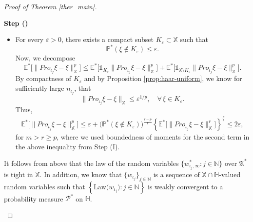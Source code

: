\documentclass[english,a4paper,11pt]{amsart}
\theoremstyle{plain}
\theoremstyle{definition}
\theoremstyle{remark}
\numberwithin{equation}{section}
\newcounter{lil1}
\newenvironment{step}
{\begin{list} { \bf Step (\Roman{lil1})}
		{ \usecounter{lil1}
			\setlength{\leftmargin}{0.0cm}
			\setlength{\topsep}{0.2cm}
			\setlength{\itemsep}{0.0cm}
			\setlength{\parsep}{0.1cm}
			\setlength{\itemindent}{0.8cm}
			\setlength{\parskip}{0.0cm}}}
	{\end{list}}
\newcounter{lil33}
\newcounter{lil1q}
\newcommand{\Law}{\mbox{Law}}
\newcommand{\NN}{\mathbb{N}}
\newcommand{\N}{\mathbb{N}}
\newcommand{\Pro}{Pro}
\begin{document}
\begin{proof}[Proof of Theorem \ref{ther_main}]
\begin{step}
\begin{itemize}
	\item 
	For every $\varepsilon > 0$, there exists a compact subset $K_\varepsilon \subset \mathbb{X}$ such that
	\[
	\mathbb{P}^{\ast} \left( \xi \notin K_\varepsilon \right) \leq \varepsilon.
	\]
	Now, we decompose
	\[
	\mathbb{E}^{\ast}\Big[\big\|\Pro_{{\iota_j}}\xi - \xi \big\|^p_{\mathbb{X}}\Big]
	\le 
	\mathbb{E}^{\ast} \Big[ \mathds{1}_{K_\varepsilon} \big\| \Pro_{{\iota_j}}\xi - \xi \big\|^p_{\mathbb{X}} \Big]
	+
	\mathbb{E}^{\ast} \Big[ \mathds{1}_{\mathbb{X}\setminus K_\varepsilon} \big\| \Pro_{{\iota_j}}\xi - \xi \big\|^p_{\mathbb{X}} \Big].
	\]
	By compactness of $K_\varepsilon$ and by Proposition \ref{prop:haar-uniform}, we know for sufficiently large $n_{\iota_j}$, that
	\[
	\big\| \Pro_{{\iota_j}} \xi  - \xi \big\|_{\mathbb{X}} \leq \varepsilon^{1/p}, \quad \forall\, \xi \in K_\varepsilon.
	\]
	Thus,
	\begin{align*}
	\mathbb{E}^{\ast}\Big[ \big\| \Pro_{{\iota_j}}\xi - \xi \big\|^p_{\mathbb{X}}\Big]
	\leq 
	\varepsilon +\big(  \mathbb{P}^{\ast} \left( \xi \notin K_\varepsilon \right)\big)^{\frac{r-p}{r}} \left\{\mathbb{E}^{\ast} \Big[\big\| \Pro_{{\iota_j}}\xi - \xi \big\|^r_{\mathbb{X}}\Big]\right\}^{\frac{p}{r}}
	\leq 2\varepsilon,
\end{align*} for $m>r\geq p$, where we used boundedness of moments for the second term in the above inequality from Step (I).	
\end{itemize}
\newcommand{\Xw}{\widetilde{w}}
\newcommand{\Xwt}{\widetilde{w}}
\newcommand{\Xwtt}{\widetilde{\widetilde{w}}}



It follows from above that the law of the random variables  $\{{w}_{\iota_j,\infty}^\ast:j\in\NN\}$ over $\mathfrak{A}^\ast$ 
is tight in $\mathbb{X}$.  In addition, we know that 
$\{ w _{{\iota_j}}\}_{j\in\mathbb{N}}$ is a sequence of $\mathbb{X}\cap \mathbb{H}$-valued random variables
such that $\left\{\Law\big( w _{{\iota_j}}\big):j\in\N\right\}$ is weakly convergent to a probability measure $\mathscr{P}^\ast $ on $\mathbb{H}$.
%


\end{step}
\end{proof}
\end{document}
